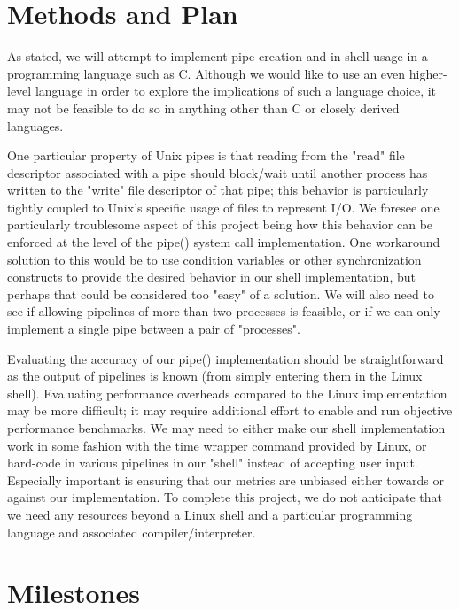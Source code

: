 \section{Methods and Plan}

As stated, we will attempt to implement pipe creation and in-shell usage in a programming language such as C. Although we would like to use an even higher-level language in order to explore the implications of such a language choice, it may not be feasible to do so in anything other than C or closely derived languages. 

One particular property of Unix pipes is that reading from the "read" file descriptor associated with a pipe should block/wait until another process has written to the "write" file descriptor of that pipe; this behavior is particularly tightly coupled to Unix's specific usage of files to represent I/O. We foresee one particularly troublesome aspect of this project being how this behavior can be enforced at the level of the pipe() system call implementation. One workaround solution to this would be to use condition variables or other synchronization constructs to provide the desired behavior in our shell implementation, but perhaps that could be considered too "easy" of a solution. We will also need to see if allowing pipelines of more than two processes is feasible, or if we can only implement a single pipe between a pair of "processes".

Evaluating the accuracy of our pipe() implementation should be straightforward as the output of pipelines is known (from simply entering them in the Linux shell).  Evaluating performance overheads compared to the Linux implementation may be more difficult; it may require additional effort to enable and run objective performance benchmarks. We may need to either make our shell implementation work in some fashion with the time wrapper command provided by Linux, or hard-code in various pipelines in our "shell" instead of accepting user input. Especially important is ensuring that our metrics are unbiased either towards or against our implementation.  To complete this project, we do not anticipate that we need any resources beyond a Linux shell and a particular programming language and associated compiler/interpreter.

\section{Milestones}

